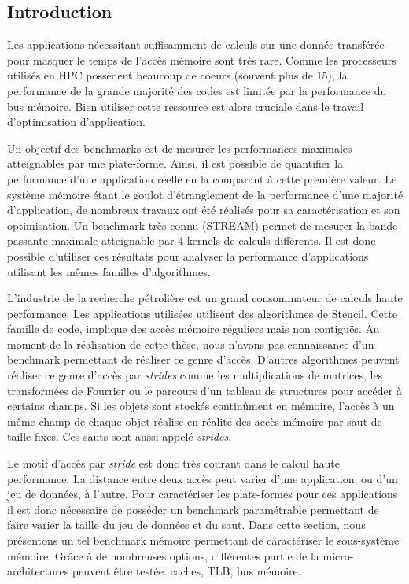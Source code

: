 \subsection{Introduction}

        Les applications nécessitant suffisamment de calculs sur une donnée transférée pour masquer le temps de l'accès mémoire sont très rare. Comme les processeurs utilisés en HPC possèdent beaucoup de coeurs (souvent plus de 15), la performance de la grande majorité des codes est limitée par la performance du bus mémoire. Bien utiliser cette ressource est alors cruciale dans le travail d'optimisation d'application. 

        Un objectif des benchmarks est de mesurer les performances maximales atteignables par une plate-forme. Ainsi, il est possible de quantifier la performance d'une application réelle en la comparant à cette première valeur. Le système mémoire étant le goulot d'étranglement de la performance d'une majorité d'application, de nombreux travaux ont été réalisés pour sa caractérisation et son optimisation. Un benchmark très connu (STREAM) permet de mesurer la bande passante maximale atteignable par 4 kernels de calculs différents. Il est donc possible d'utiliser ces résultats pour analyser la performance d'applications utilisant les mêmes familles d'algorithmes.

        L'industrie de la recherche pétrolière est un grand consommateur de calculs haute performance. Les applications utilisées utilisent des algorithmes de Stencil. Cette famille de code, implique des accès mémoire réguliers mais non contiguës. Au moment de la réalisation de cette thèse, nous n'avons pas connaissance d'un benchmark permettant de réaliser ce genre d'accès.  D'autres algorithmes peuvent réaliser ce genre d'accès par \textit{strides} comme les multiplications de matrices, les transformées de Fourrier ou le parcours d'un tableau de structures pour accéder à certains champs. Si les objets sont stockés continûment en mémoire, l'accès à un même champ de chaque objet réalise en réalité des accès mémoire par saut de taille fixes. Ces sauts sont aussi appelé \textit{strides}.

        Le motif d'accès par \textit{stride} est donc très courant dans le calcul haute performance. La distance entre deux accès peut varier d'une application, ou d'un jeu de données, à l'autre. Pour caractériser les plate-formes pour ces applications il est donc nécessaire de posséder un benchmark paramétrable permettant de faire varier la taille du jeu de données et du saut. Dans cette section, nous présentons un tel benchmark mémoire permettant de caractériser le sous-système mémoire. Grâce à de nombreuses options, différentes partie de la micro-architectures peuvent être testée: caches, TLB, bus mémoire. 



